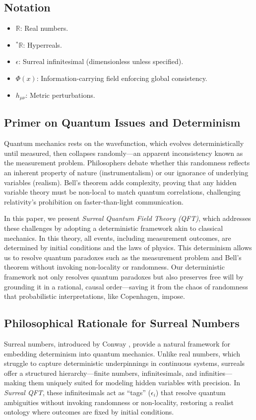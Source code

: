 \documentclass{article}
\begin{document}
\subsection*{Notation}
\begin{itemize}
    \item \(\mathbb{R}\): Real numbers.
    \item \({}^*\mathbb{R}\): Hyperreals.
    \item \(\epsilon\): Surreal infinitesimal (dimensionless unless specified).
    \item \(\Phi(x)\): Information-carrying field enforcing global consistency.
    \item \(h_{\mu\nu}\): Metric perturbations.
\end{itemize}

\subsection{Primer on Quantum Issues and Determinism}
Quantum mechanics rests on the wavefunction, which evolves deterministically until measured, then collapses randomly---an apparent inconsistency known as the measurement problem. Philosophers debate whether this randomness reflects an inherent property of nature (instrumentalism) or our ignorance of underlying variables (realism). Bell's theorem adds complexity, proving that any hidden variable theory must be non-local to match quantum correlations, challenging relativity's prohibition on faster-than-light communication.

In this paper, we present \textit{Surreal Quantum Field Theory (QFT)}, which addresses these challenges by adopting a deterministic framework akin to classical mechanics. In this theory, all events, including measurement outcomes, are determined by initial conditions and the laws of physics. This determinism allows us to resolve quantum paradoxes such as the measurement problem and Bell's theorem without invoking non-locality or randomness. Our deterministic framework not only resolves quantum paradoxes but also preserves free will by grounding it in a rational, causal order---saving it from the chaos of randomness that probabilistic interpretations, like Copenhagen, impose.

\subsection{Philosophical Rationale for Surreal Numbers}
Surreal numbers, introduced by Conway \cite{Conway1976}, provide a natural framework for embedding determinism into quantum mechanics. Unlike real numbers, which struggle to capture deterministic underpinnings in continuous systems, surreals offer a structured hierarchy---finite numbers, infinitesimals, and infinities---making them uniquely suited for modeling hidden variables with precision. In \textit{Surreal QFT}, these infinitesimals act as ``tags'' (\(\epsilon_i\)) that resolve quantum ambiguities without invoking randomness or non-locality, restoring a realist ontology where outcomes are fixed by initial conditions.
\end{document}
